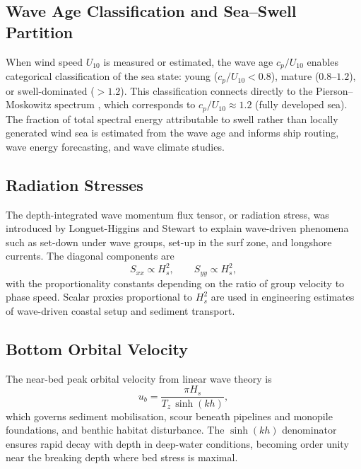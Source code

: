 \documentclass[journal]{IEEEtran}
\begin{document}
    \subsection{Wave Age Classification and Sea--Swell Partition}

    When wind speed $U_{10}$ is measured or estimated, the wave age
    $c_p/U_{10}$ enables categorical classification of the sea state:
    young ($c_p/U_{10} < 0.8$), mature ($0.8$--$1.2$), or
    swell-dominated ($> 1.2$).
    This classification connects directly to the Pierson--Moskowitz
    spectrum \cite{PiersonMoskowitz1964}, which corresponds to
    $c_p/U_{10} \approx 1.2$ (fully developed sea).
    The fraction of total spectral energy attributable to swell rather
    than locally generated wind sea is estimated from the wave age
    and informs ship routing, wave energy forecasting, and wave
    climate studies.

    \subsection{Radiation Stresses}

    The depth-integrated wave momentum flux tensor, or radiation stress,
    was introduced by Longuet-Higgins and Stewart
    \cite{LonguetHigginsStewart1964} to explain wave-driven phenomena
    such as set-down under wave groups, set-up in the surf zone, and
    longshore currents.
    The diagonal components are
    \begin{equation}
        S_{xx} \propto H_s^2, \qquad S_{yy} \propto H_s^2,
    \end{equation}
    with the proportionality constants depending on the ratio of group
    velocity to phase speed.
    Scalar proxies proportional to $H_s^2$ are used in engineering
    estimates of wave-driven coastal setup and sediment transport.

    \subsection{Bottom Orbital Velocity}

    The near-bed peak orbital velocity from linear wave theory is
    \begin{equation}
        u_b = \frac{\pi H_s}{T_z\,\sinh(kh)},
    \end{equation}
    which governs sediment mobilisation, scour beneath pipelines and
    monopile foundations, and benthic habitat disturbance.
    The $\sinh(kh)$ denominator ensures rapid decay with depth in
    deep-water conditions, becoming order unity near the breaking depth
    where bed stress is maximal.
\end{document}
